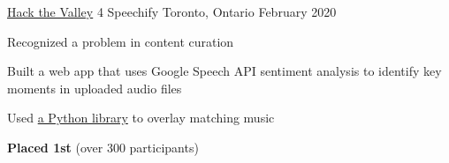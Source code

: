 
\begin{cventries}

  \cventry
    {\href{https://hackthevalley.io/}{Hack the Valley} 4} %
    {Speechify} %
    {Toronto, Ontario} %
    {February 2020} %
    {
      \begin{cvitems} %
        \item{Recognized a problem in content curation}
        \item{Built a web app that uses Google Speech API sentiment analysis to identify key moments in uploaded audio files}
        \item{Used \href{https://pypi.org/project/pydub/}{a Python library} to overlay matching music}
        \item {\textbf{Placed 1st} (over 300 participants)}
      \end{cvitems}
    }


\end{cventries}
